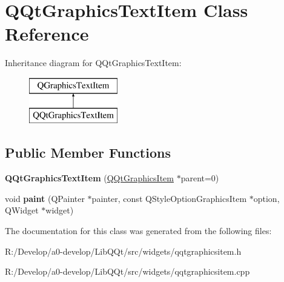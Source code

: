 \hypertarget{class_q_qt_graphics_text_item}{}\section{Q\+Qt\+Graphics\+Text\+Item Class Reference}
\label{class_q_qt_graphics_text_item}
Inheritance diagram for Q\+Qt\+Graphics\+Text\+Item\+:\begin{figure}[H]
\begin{center}
\leavevmode
\includegraphics[height=2.000000cm]{class_q_qt_graphics_text_item}
\end{center}
\end{figure}
\subsection*{Public Member Functions}
\begin{DoxyCompactItemize}
\item 
\mbox{\label{class_q_qt_graphics_text_item_a5610c594367b267af13e83100d1d6596}} 
{\bfseries Q\+Qt\+Graphics\+Text\+Item} (\mbox{\hyperlink{class_q_qt_graphics_item}{Q\+Qt\+Graphics\+Item}} $\ast$parent=0)
\item 
\mbox{\label{class_q_qt_graphics_text_item_a30330957564ff9469929cff311922f09}} 
void {\bfseries paint} (Q\+Painter $\ast$painter, const Q\+Style\+Option\+Graphics\+Item $\ast$option, Q\+Widget $\ast$widget)
\end{DoxyCompactItemize}


The documentation for this class was generated from the following files\+:\begin{DoxyCompactItemize}
\item 
R\+:/\+Develop/a0-\/develop/\+Lib\+Q\+Qt/src/widgets/qqtgraphicsitem.\+h\item 
R\+:/\+Develop/a0-\/develop/\+Lib\+Q\+Qt/src/widgets/qqtgraphicsitem.\+cpp\end{DoxyCompactItemize}
